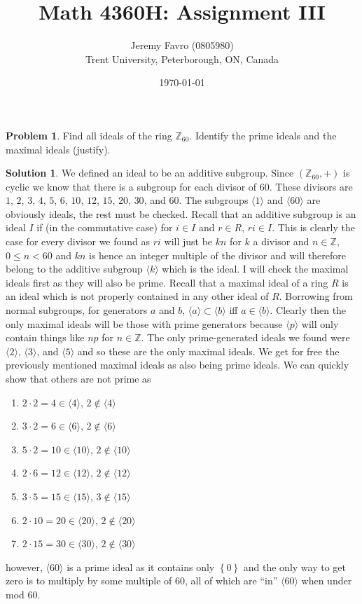 \documentclass[10pt]{article}
\title{Math 4360H: Assignment III}
\author{Jeremy Favro (0805980) \\ Trent University, Peterborough, ON, Canada}
\date{\today}
\theoremstyle{definition}
\newtheorem{problem}{Problem}
\newtheorem{soln}{Solution}
\newcommand{\hull}[1]{\langle {#1}\rangle}
\begin{document}
\maketitle

\begin{problem} Find all ideals of the ring $\mathbb{Z}_{60}$. Identify the prime ideals and the
maximal ideals (justify).
\end{problem}
\begin{soln}
  We defined an ideal to be an additive subgroup. Since $(\mathbb{Z}_{60},+)$ is cyclic we know that there is a subgroup for each
  divisor of $60$. These divisors are $1$,
  $2$,
  $3$,
  $4$,
  $5$,
  $6$,
  $10$,
  $12$,
  $15$,
  $20$,
  $30$, and
  $60$. The subgroups $\hull{1}$ and $\hull{60}$ are obviously ideals, the rest must be checked.
  Recall that an additive subgroup is an ideal $I$ if (in the commutative case) for $i\in I$ and $r\in R$,
  $ri\in I$. This is clearly the case for every divisor we found as $ri$ will just be $kn$ for $k$ a divisor
  and $n\in \mathbb{Z}$, $0\leq n < 60$ and $kn$ is hence an integer multiple of the divisor and will therefore belong to the
  additive subgroup $\hull{k}$ which is the ideal. I will check the maximal ideals first as they will also be prime. Recall that a maximal
  ideal of a ring $R$ is an ideal which is not properly contained in any other ideal of $R$. Borrowing from normal subgroups,
  for generators $a$ and $b$, $\hull{a}\subset \hull{b}$ iff $a\in \hull{b}$. Clearly then the only maximal ideals will be those with prime
  generators because $\hull{p}$ will only contain things like $np$ for $n\in \mathbb{Z}$. The only prime-generated ideals we found were
  $\hull{2}$, $\hull{3}$, and $\hull{5}$ and so these are the only maximal ideals. We get for free the previously mentioned maximal ideals
  as also being prime ideals. We can quickly show that others are not prime as
  \begin{enumerate}[label=(\roman*)]
    \item $2\cdot2=4\in\hull{4}$, $2\notin \hull{4}$
    \item $3\cdot 2=6\in \hull{6}$, $2\notin \hull{6}$
    \item $5\cdot 2=10\in \hull{10}$, $2\notin \hull{10}$
    \item $2\cdot 6=12\in\hull{12}$, $2\notin \hull{12}$
    \item $3\cdot 5=15\in\hull{15}$, $3\notin \hull{15}$
    \item $2\cdot 10=20\in\hull{20}$, $2\notin \hull{20}$
    \item $2\cdot 15=30\in\hull{30}$, $2\notin \hull{30}$
  \end{enumerate}
  however, $\hull{60}$ is a prime ideal as it contains only $\left\{0\right\}$ and the only way to get zero is to multiply by some multiple of
  $60$, all of which are ``in'' $\hull{60}$ when under mod 60.
\end{soln}
\end{document}
